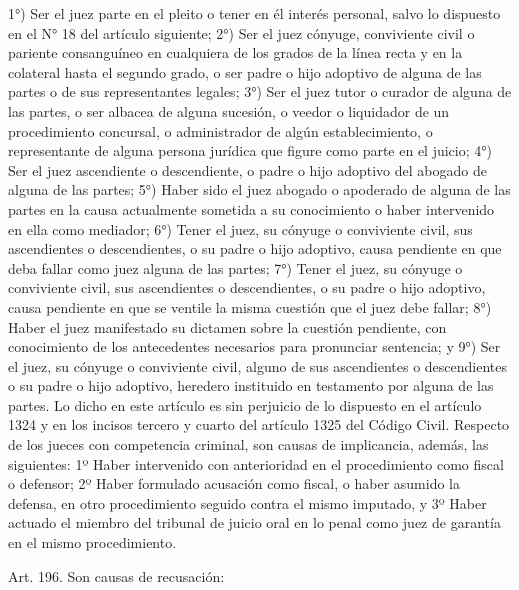    1°) Ser el juez parte en el pleito o tener en él interés personal, salvo lo dispuesto en el N° 18 del artículo siguiente;
    2°) Ser el juez cónyuge, conviviente civil o pariente consanguíneo en cualquiera de los grados de la línea recta y en la colateral hasta el segundo grado, o ser padre o hijo adoptivo de alguna de las partes o de sus representantes legales;
    3°) Ser el juez tutor o curador de alguna de las partes, o ser albacea de alguna sucesión, o veedor o liquidador de un procedimiento concursal, o administrador de algún establecimiento, o representante de alguna persona jurídica que figure como parte en el juicio;
    4°) Ser el juez ascendiente o descendiente, o padre o hijo adoptivo del abogado de alguna de las partes;
    5°) Haber sido el juez abogado o apoderado de alguna de las partes en la causa actualmente sometida a su conocimiento o haber intervenido en ella como mediador;
    6°) Tener el juez, su cónyuge o conviviente civil, sus ascendientes o descendientes, o su padre o hijo adoptivo, causa pendiente en que deba fallar como juez alguna de las partes;
    7°) Tener el juez, su cónyuge o conviviente civil, sus ascendientes o descendientes, o su padre o hijo adoptivo, causa pendiente en que se ventile la misma cuestión que el juez debe fallar;
    8°) Haber el juez manifestado su dictamen sobre la cuestión pendiente, con conocimiento de los antecedentes necesarios para pronunciar sentencia; y
    9°) Ser el juez, su cónyuge o conviviente civil, alguno de sus ascendientes o descendientes o su padre o hijo adoptivo, heredero instituido en testamento por alguna de las partes.
    Lo dicho en este artículo es sin perjuicio de lo dispuesto en el artículo 1324 y en los incisos tercero y cuarto del artículo 1325 del Código Civil.
    Respecto de los jueces con competencia criminal, son causas de implicancia, además, las siguientes:
    1º Haber intervenido con anterioridad en el procedimiento como fiscal o defensor;
    2º Haber formulado acusación como fiscal, o haber asumido la defensa, en otro procedimiento seguido contra el mismo imputado, y
    3º Haber actuado el miembro del tribunal de juicio oral en lo penal como juez de garantía en el mismo procedimiento.



    Art. 196. Son causas de recusación:

